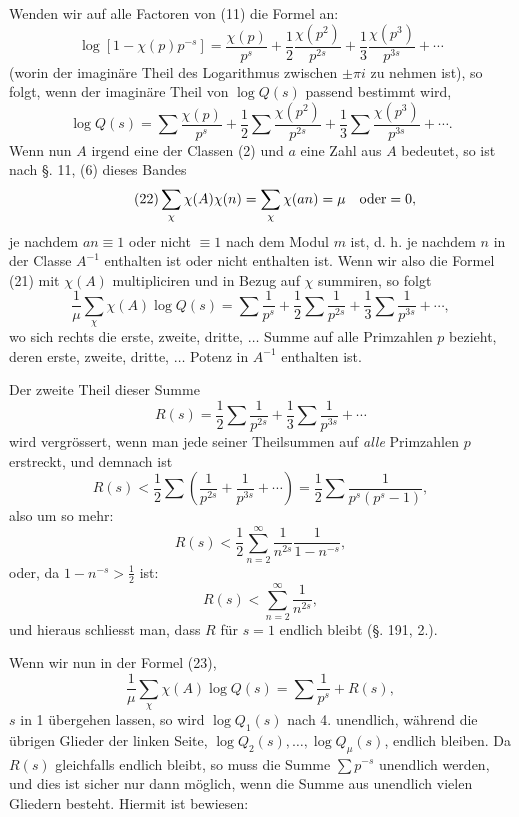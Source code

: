 \documentclass[11pt]{article}
\begin{document}
Wenden wir auf alle Factoren von (11) die Formel an:
\[
\log[1-\chi(p)p^{-s}]
=\frac{\chi(p)}{p^s}+\frac12\frac{\chi(p^2)}{p^{2s}}+\frac13\frac{\chi(p^3)}{p^{3s}}+\cdots
\]
(worin der imaginäre Theil des Logarithmus zwischen $\pm\pi i$ zu nehmen ist), so folgt, wenn der imaginäre Theil von $\log Q(s)$ passend bestimmt wird,
\begin{equation}\tag{21}
\log Q(s)=\sum\frac{\chi(p)}{p^s}+\frac12\sum\frac{\chi(p^2)}{p^{2s}}+\frac13\sum\frac{\chi(p^3)}{p^{3s}}+\cdots .
\end{equation}
Wenn nun $A$ irgend eine der Classen (2) und $a$ eine Zahl aus $A$ bedeutet, so ist nach §. 11, (6) dieses Bandes
\begin{equation}\tag{22}
\sum_\chi \chi(A)\chi(n)=\sum_\chi \chi(an)=\mu\quad\hbox{oder}=0,
\end{equation}
je nachdem $an\equiv1$ oder nicht $\equiv1$ nach dem Modul $m$ ist, d. h. je nachdem $n$ in der Classe $A^{-1}$ enthalten ist oder nicht enthalten ist. Wenn wir also die Formel (21) mit $\chi(A)$ multipliciren und in Bezug auf $\chi$ summiren, so folgt
\begin{equation}\tag{23}
\frac1\mu\sum_\chi \chi(A)\log Q(s)=
\sum\frac1{p^s}+\frac12\sum\frac1{p^{2s}}+\frac13\sum\frac1{p^{3s}}+\cdots,
\end{equation}
wo sich rechts die erste, zweite, dritte, $\ldots$ Summe auf alle Primzahlen $p$ bezieht, deren erste, zweite, dritte, $\ldots$ Potenz in $A^{-1}$ enthalten ist.

Der zweite Theil dieser Summe
\[
R(s)=\frac12\sum\frac1{p^{2s}}+\frac13\sum\frac1{p^{3s}}+\cdots
\]
wird vergrössert, wenn man jede seiner Theilsummen auf \emph{alle} Primzahlen $p$ erstreckt, und demnach ist
\[
R(s)<\frac12\sum\left(\frac1{p^{2s}}+\frac1{p^{3s}}+\cdots\right)
=\frac12\sum\frac1{p^s(p^s-1)},
\]
also um so mehr:
\[
R(s)<\frac12\sum_{n=2}^{\infty}\frac1{n^{2s}}\frac1{1-n^{-s}},
\]
oder, da $1-n^{-s}>\frac12$ ist:
\[
R(s)<\sum_{n=2}^{\infty}\frac1{n^{2s}},
\]
und hieraus schliesst man, dass $R$ für $s=1$ endlich bleibt (§. 191, 2.).

Wenn wir nun in der Formel (23),
\[
\frac1\mu\sum_\chi \chi(A)\log Q(s)=\sum\frac1{p^s}+R(s),
\]
$s$ in 1 übergehen lassen, so wird $\log Q_1(s)$ nach 4. unendlich, während die übrigen Glieder der linken Seite, $\log Q_2(s),\ldots,\log Q_\mu(s)$, endlich bleiben. Da $R(s)$ gleichfalls endlich bleibt, so muss die Summe $\sum p^{-s}$ unendlich werden, und dies ist sicher nur dann möglich, wenn die Summe aus unendlich vielen Gliedern besteht. Hiermit ist bewiesen:
\end{document}
